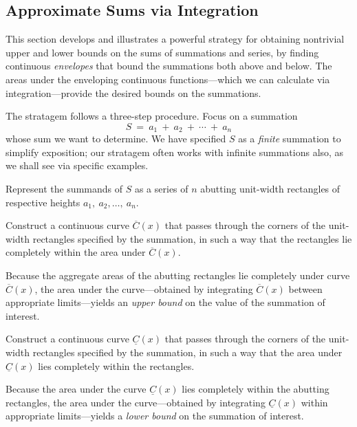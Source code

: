 \subsection{Approximate Sums via Integration}
\label{sec:riemann-bounds}

This section develops and illustrates a powerful strategy for obtaining nontrivial upper and lower bounds on the sums of summations and series, by finding continuous {\em envelopes} that bound the summations both above and below.  The areas under the enveloping continuous functions---which we can calculate via integration---provide the desired bounds on the summations.

\medskip

The stratagem follows a three-step procedure.  Focus on a summation
\[ S \ = \ a_1 \ + \ a_2 \ + \ \cdots \ + \ a_n \]
whose sum we want to determine.  We have specified $S$ as a {\em finite} summation to simplify exposition; our stratagem often works with infinite summations also, as we shall see via specific examples.

\medskip

Represent the summands of $S$ as a series of $n$ abutting unit-width rectangles of respective heights $a_1, \ a_2, \ldots, \ a_n$.  


\medskip

Construct a continuous curve $\overline{C}(x)$ that passes through the corners of the unit-width rectangles specified by the summation, in such a way that the rectangles lie completely within the area under $\overline{C}(x)$.

\medskip

\noindent
Because the aggregate areas of the abutting rectangles lie completely under curve $\overline{C}(x)$, the area under the curve---obtained by integrating $\overline{C}(x)$ between appropriate limits---yields an {\em upper bound} on the value of the summation of interest.

\medskip

Construct a continuous curve $\underline{C}(x)$ that passes through the corners of the unit-width rectangles specified by the summation, in such a way that the area under $\underline{C}(x)$ lies completely within the rectangles.

\medskip

\noindent
Because the area under the curve $\underline{C}(x)$ lies completely within the abutting rectangles, the area under the curve---obtained by integrating $\underline{C}(x)$ within appropriate limits---yields a {\em lower bound} on the summation of interest.

